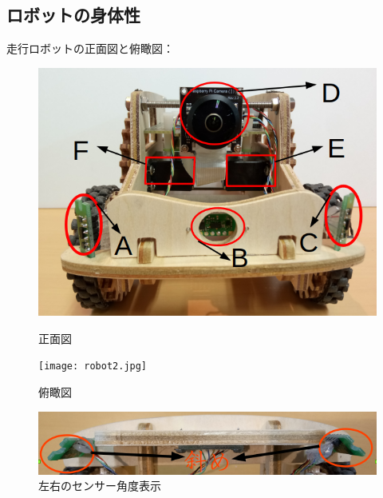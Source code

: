 \documentclass[twocolumn]{jarticle} %
\begin{document}
\subsection{ロボットの身体性}
走行ロボットの正面図と俯瞰図：
\begin{figure}[h]
    \begin{minipage}{0.48\linewidth}
        \centering
        \includegraphics[width=0.9\linewidth]{robot1.jpg}
        \caption{正面図}
    \end{minipage}
    \begin{minipage}{0.48\linewidth}
        \centering
        \texttt{[image: robot2.jpg]}
        \caption{俯瞰図}
    \end{minipage}
\end{figure}
\begin{figure}[h]
        \centering
        \includegraphics[width=1.0\linewidth]{robot4.jpg}
        \caption{左右のセンサー角度表示}
\end{figure}
\end{document}
